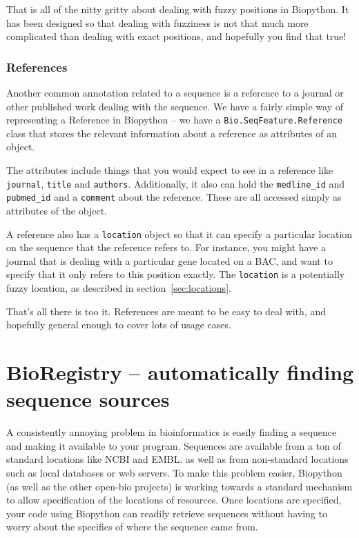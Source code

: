 \documentclass{report}
\begin{document}
That is all of the nitty gritty about dealing with fuzzy positions in Biopython. It has been designed so that dealing with fuzziness is not that much more complicated than dealing with exact positions, and hopefully you find that true!
 
\subsubsection{References}

Another common annotation related to a sequence is a reference to a journal or other published work dealing with the sequence. We have a fairly simple way of representing a Reference in Biopython -- we have a \verb|Bio.SeqFeature.Reference| class that stores the relevant information about a reference as attributes of an object.


The attributes include things that you would expect to see in a reference like \verb|journal|, \verb|title| and \verb|authors|. Additionally, it also can hold the \verb|medline_id| and \verb|pubmed_id| and a \verb|comment| about the reference. These are all accessed simply as attributes of the object.


A reference also has a \verb|location| object so that it can specify a particular location on the sequence that the reference refers to. For instance, you might have a journal that is dealing with a particular gene located on a BAC, and want to specify that it only refers to this position exactly. The \verb|location| is a potentially fuzzy location, as described in section~\ref{sec:locations}.


That's all there is too it. References are meant to be easy to deal with, and hopefully general enough to cover lots of usage cases.

\section{BioRegistry -- automatically finding sequence sources}

A consistently annoying problem in bioinformatics is easily finding a
sequence and making it available to your program. Sequences are
available from a ton of standard locations like NCBI and EMBL. as well
as from non-standard locations such as local databases or web servers.
To make this problem easier, Biopython (as well as the other open-bio
projects) is working towards a standard mechanism to allow specification
of the locations of resources. Once locations are specified, your code
using Biopython can readily retrieve sequences without having to worry
about the specifics of where the sequence came from.
\end{document}
